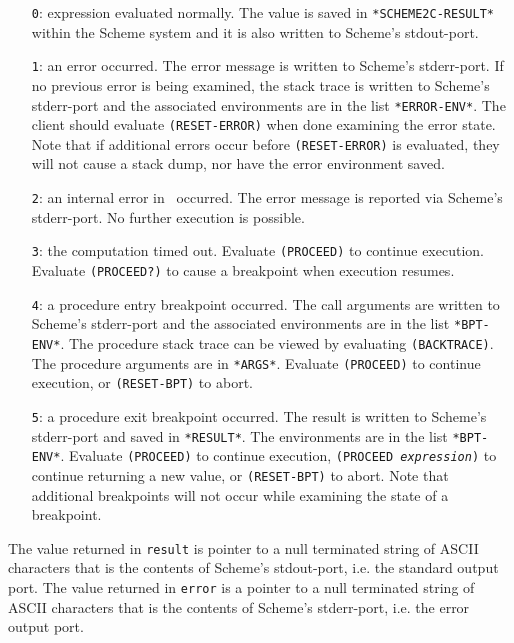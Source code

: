 \documentclass[12pt]{article}
\begin{document}
\begin{itemize}
\item[\texttt{0}:] expression evaluated normally.  The value is saved
  in \texttt{*SCHEME2C-RESULT*} within the Scheme system and it is
  also written to Scheme's stdout-port.

\item[\texttt{1}:] an error occurred.  The error message is written to
  Scheme's stderr-port.  If no previous error is being examined, the
  stack trace is written to Scheme's stderr-port and the associated
  environments are in the list \texttt{*ERROR-ENV*}.  The client
  should evaluate \texttt{(RESET-ERROR)} when done examining the error
  state.  Note that if additional errors occur before
  \texttt{(RESET-ERROR)} is evaluated, they will not cause a stack
  dump, nor have the error environment saved.

\item[\texttt{2}:] an internal error in \StoC\ occurred.  The error
  message is reported via Scheme's stderr-port.  No further execution
  is possible.

\item[\texttt{3}:] the computation timed out.  Evaluate
  \texttt{(PROCEED)} to continue execution.  Evaluate
  \texttt{(PROCEED?)} to cause a breakpoint when execution resumes.

\item[\texttt{4}:] a procedure entry breakpoint occurred.  The call
  arguments are written to Scheme's stderr-port and the associated
  environments are in the list \texttt{*BPT-ENV*}. The procedure stack
  trace can be viewed by evaluating \texttt{(BACKTRACE)}.  The
  procedure arguments are in \texttt{*ARGS*}. Evaluate
  \texttt{(PROCEED)} to continue execution, or \texttt{(RESET-BPT)} to
  abort.

\item[\texttt{5}:] a procedure exit breakpoint occurred.  The result
  is written to Scheme's stderr-port and saved in \texttt{*RESULT*}.
  The environments are in the list \texttt{*BPT-ENV*}.  Evaluate
  \texttt{(PROCEED)} to continue execution, \texttt{(PROCEED
    \textnormal{\emph{expression}})} to continue returning a new
  value, or \texttt{(RESET-BPT)} to abort.  Note that additional
  breakpoints will not occur while examining the state of a
  breakpoint.
\end{itemize}

The value returned in \texttt{result} is pointer to a null terminated
string of ASCII characters that is the contents of Scheme's
stdout-port, i.e. the standard output port.  The value returned in
\texttt{error} is a pointer to a null terminated string of ASCII
characters that is the contents of Scheme's stderr-port, i.e. the
error output port.
\end{document}
